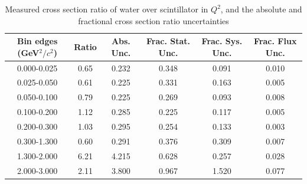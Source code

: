 \documentclass[../main.tex]{subfiles}
\begin{document}
\begin{turnpage}
\begin{table}
  \centering
  \renewcommand{\arraystretch}{1.15}
  \caption{Systematic covariance matrix of measured cross section ratio of water over scintillator in $p_{\mu,T}$}
  \label{tbl:rationucleonnuc10muon_ptc}
\end{table}
\end{turnpage}
\begin{table}
  \centering
  \renewcommand{\arraystretch}{1.15}
  \caption{Measured cross section ratio of water over scintillator in $Q^2$, and the absolute and fractional cross section ratio uncertainties}
    \begin{tabular}{c||c|c||c|c|c}
      Bin edges (GeV${}^2/c{}^2$) &  Ratio  &  Abs. Unc.  &  Frac. Stat. Unc.  &  Frac. Sys. Unc.  &  Frac. Flux Unc. \\
      \hline
      \hline
      0.000-0.025 & 0.65 & 0.232 & 0.348 & 0.091 & 0.010\\
      0.025-0.050 & 0.61 & 0.225 & 0.331 & 0.163 & 0.005\\
      0.050-0.100 & 0.79 & 0.225 & 0.269 & 0.093 & 0.008\\
      0.100-0.200 & 1.12 & 0.285 & 0.225 & 0.117 & 0.005\\
      0.200-0.300 & 1.03 & 0.295 & 0.254 & 0.133 & 0.003\\
      0.300-1.300 & 0.60 & 0.291 & 0.376 & 0.309 & 0.007\\
      1.300-2.000 & 6.21 & 4.215 & 0.628 & 0.257 & 0.028\\
      2.000-3.000 & 2.11 & 3.800 & 0.967 & 1.520 & 0.077
    \end{tabular}
  \label{tbl:rationucleonnuc10q2a}
\end{table}
\end{document}
